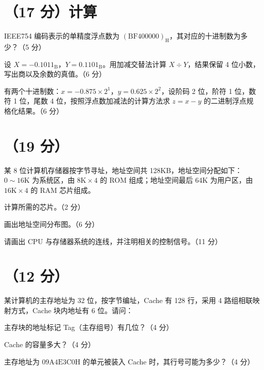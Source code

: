\noindent{}\par

\section{（17 分）计算}
\begin{question}[index=1]
IEEE754 编码表示的单精度浮点数为 $(\mathrm{BF400000})_{\mathrm H}$，其对应的十进制数为多少？（5 分）
\end{question}
\begin{question}[index=2]
设 $X=-0.1011_{\mathrm B}$，$Y=0.1101_{\mathrm B}$。用加减交替法计算 $X\div Y$，结果保留 4 位小数，写出商以及余数的真值。（6 分）
\end{question}
\begin{question}[index=3]
有两个十进制数：$x=-0.875\times 2^1$，$y=0.625\times 2^2$，设阶码 2 位，阶符 1 位，数符 1 位，尾数 4 位，按照浮点数加减法的计算方法求 $z=x-y$ 的二进制浮点规格化结果。（6 分）
\end{question}

\section{（19 分）}
某 8 位计算机存储器按字节寻址，地址空间共 128KB，地址空间分配如下：$0\sim 16\mathrm K$ 为系统区，由 $8\mathrm K\times 4$ 的 ROM 组成；地址空间最后 64K 为用户区，由 $16\mathrm K\times 4$ 的 RAM 芯片组成。
\begin{question}[index=1]
计算所需的芯片。（2 分）
\end{question}
\begin{question}[index=2]
画出地址空间分布图。（6 分）
\end{question}
\begin{question}[index=3]
请画出 CPU 与存储器系统的连线，并注明相关的控制信号。（11 分）
\end{question}

\section{（12 分）}
某计算机的主存地址为 32 位，按字节编址，Cache 有 128 行，采用 4 路组相联映射方式，Cache 块内地址有 6 位。请问：
\begin{question}[index=1]
主存块的地址标记 Tag（主存组号）有几位？（4 分）
\end{question}
\begin{question}[index=2]
Cache 的容量多大？（4 分）
\end{question}
\begin{question}[index=3]
主存地址为 $\mathrm{09A4E3C0H}$ 的单元被装入 Cache 时，其行号可能为多少？（4 分）
\end{question}

